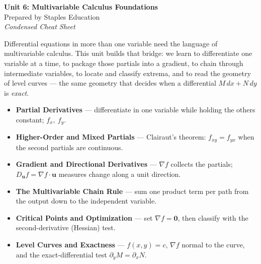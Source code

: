 




\begin{center}
    {\LARGE \bfseries Unit 6: Multivariable Calculus Foundations}\\[6pt]
    {\large Prepared by Staples Education}\\[4pt]
    {\itshape Condensed Cheat Sheet}
\end{center}

\vspace{0.4em}

\begin{topicsbox}
Differential equations in more than one variable need the language of
multivariable calculus. This unit builds that bridge: we learn to differentiate
one variable at a time, to package those partials into a gradient, to chain
through intermediate variables, to locate and classify extrema, and to read the
geometry of level curves --- the same geometry that decides when a differential
$M\,dx+N\,dy$ is \emph{exact}.
\begin{itemize}[leftmargin=1.4em, itemsep=3pt]
    \item \textbf{Partial Derivatives} --- differentiate in one variable while
          holding the others constant; $f_x,\ f_y$.
    \item \textbf{Higher-Order and Mixed Partials} --- Clairaut's theorem:
          $f_{xy}=f_{yx}$ when the second partials are continuous.
    \item \textbf{Gradient and Directional Derivatives} --- $\nabla f$ collects
          the partials; $D_{\mathbf u}f=\nabla f\cdot\mathbf u$ measures change
          along a unit direction.
    \item \textbf{The Multivariable Chain Rule} --- sum one product term per path
          from the output down to the independent variable.
    \item \textbf{Critical Points and Optimization} --- set $\nabla f=\mathbf 0$,
          then classify with the second-derivative (Hessian) test.
    \item \textbf{Level Curves and Exactness} --- $f(x,y)=c$, $\nabla f$ normal to
          the curve, and the exact-differential test $\partial_y M=\partial_x N$.
\end{itemize}
\end{topicsbox}


